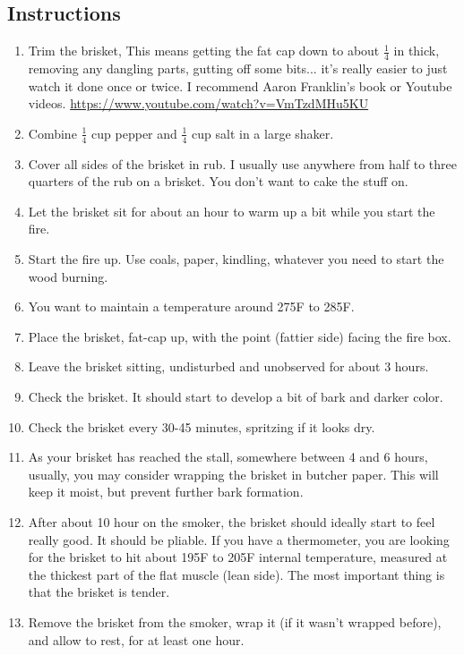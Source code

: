 \begin{multicols}{2}
\subsection*{Instructions}
\begin{enumerate}
    \item Trim the brisket, This means getting the fat cap down to about \( \frac{1}{4} \) in thick, removing any dangling parts, gutting off some bits... it's really easier to just watch it done once or twice. I recommend Aaron Franklin's book or Youtube videos. \url{https://www.youtube.com/watch?v=VmTzdMHu5KU}
    \item Combine \( \frac{1}{4} \) cup pepper and \( \frac{1}{4} \) cup salt in a large shaker.
    \item Cover all sides of the brisket in rub. I usually use anywhere from half to three quarters of the rub on a brisket. You don't want to cake the stuff on.
    \item Let the brisket sit for about an hour to warm up a bit while you start the fire.
    \item Start the fire up. Use coals, paper, kindling, whatever you need to start the wood burning.
    \item You want to maintain a temperature around 275F to 285F.
    \item Place the brisket, fat-cap up, with the point (fattier side) facing the fire box.
    \item Leave the brisket sitting, undisturbed and unobserved for about 3 hours.
    \item Check the brisket. It should start to develop a bit of bark and darker color.
    \item Check the brisket every 30-45 minutes, spritzing if it looks dry.
    \item As your brisket has reached the stall, somewhere between 4 and 6 hours, usually, you may consider wrapping the brisket in butcher paper. This will keep it moist, but prevent further bark formation.
    \item After about 10 hour on the smoker, the brisket should ideally start to feel really good. It should be pliable. If you have a thermometer, you are looking for the brisket to hit about 195F to 205F internal temperature, measured at the thickest part of the flat muscle (lean side). The most important thing is that the brisket is tender.
    \item Remove the brisket from the smoker, wrap it (if it wasn't wrapped before), and allow to rest, for at least one hour.


\end{enumerate}
\end{multicols}
